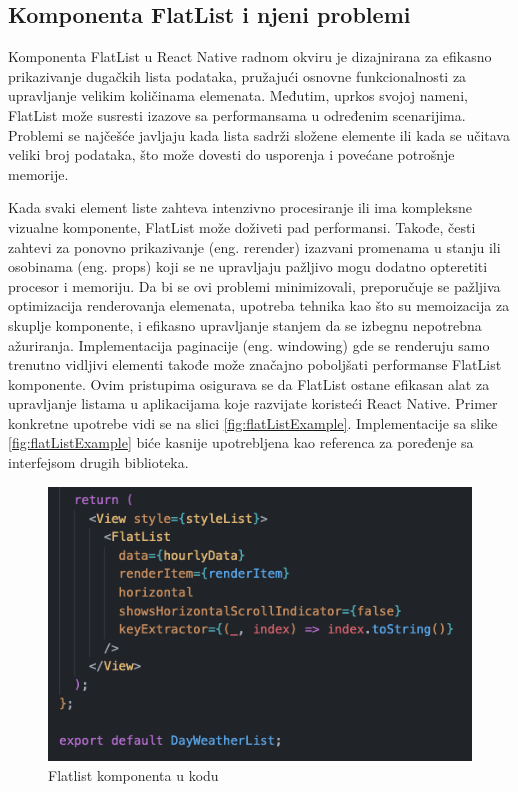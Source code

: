 \documentclass[12pt,oneside]{memoir}
\begin{document}
\subsection{Komponenta FlatList i njeni problemi}

Komponenta FlatList\cite{flatList} u React Native radnom okviru je dizajnirana za efikasno prikazivanje dugačkih lista podataka, pružajući osnovne funkcionalnosti za upravljanje velikim količinama elemenata. Međutim, uprkos svojoj nameni, FlatList može susresti izazove sa performansama u određenim scenarijima. Problemi se najčešće javljaju kada lista sadrži složene elemente ili kada se učitava veliki broj podataka, što može dovesti do usporenja i povećane potrošnje memorije.

Kada svaki element liste zahteva intenzivno procesiranje ili ima kompleksne vizualne komponente, FlatList može doživeti pad performansi. Takođe, česti zahtevi za ponovno prikazivanje (eng. rerender) izazvani promenama u stanju ili osobinama (eng. props) koji se ne upravljaju pažljivo mogu dodatno opteretiti procesor i memoriju. Da bi se ovi problemi minimizovali, preporučuje se pažljiva optimizacija renderovanja elemenata, upotreba tehnika kao što su memoizacija za skuplje komponente, i efikasno upravljanje stanjem da se izbegnu nepotrebna ažuriranja. Implementacija paginacije (eng. windowing) gde se renderuju samo trenutno vidljivi elementi takođe može značajno poboljšati performanse FlatList komponente. Ovim pristupima osigurava se da FlatList ostane efikasan alat za upravljanje listama u aplikacijama koje razvijate koristeći React Native. Primer konkretne upotrebe vidi se na slici \ref{fig:flatListExample}. Implementacije sa slike \ref{fig:flatListExample} biće kasnije upotrebljena kao referenca za poređenje sa interfejsom drugih biblioteka.

\begin{figure}[h!]
    \centering
    \includegraphics[scale=0.5]{docs/images/chapterFive/flatlistExample.png}
    \caption{Flatlist komponenta u kodu}
    \label{fig:flatListExample1}
\end{figure}
\end{document}
